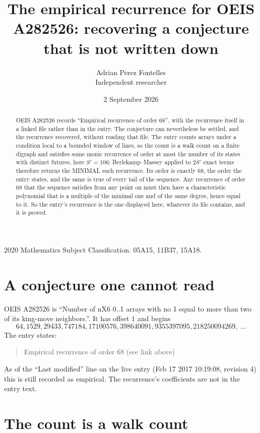 \documentclass[11pt,a4paper]{article}
\title{The empirical recurrence for OEIS A282526: recovering a conjecture that is not written down}
\author{Adrian Perez Fontelles\\ \small Independent researcher}
\date{2 September 2026}
\theoremstyle{plain}
\theoremstyle{definition}
\begin{document}
\maketitle

\begin{abstract}
OEIS A282526 records ``Empirical recurrence of order $68$'', with the recurrence itself in a
linked file rather than in the entry. The conjecture can nevertheless be settled, and the
recurrence recovered, without reading that file. The entry counts arrays under a condition
local to a bounded window of lines, so the count is a walk count on a finite digraph and
satisfies some monic recurrence of order at most the number of its states with distinct
futures, here $S'=106$; Berlekamp--Massey applied to $2S'$ exact
terms therefore returns the MINIMAL such recurrence. Its order is exactly $68$, the order
the entry states, and the same is true of every tail of the sequence. Any recurrence of order
$68$ that the sequence satisfies from any point on must then have a characteristic
polynomial that is a multiple of the minimal one and of the same degree, hence equal to it. So
the entry's recurrence is the one displayed here, whatever its file contains, and it is
proved.
\end{abstract}

\noindent\small 2020 Mathematics Subject Classification. 05A15, 11B37, 15A18.\normalsize

\section{A conjecture one cannot read}

OEIS A282526 is ``Number of nX6 0..1 arrays with no 1 equal to more than two of its king-move neighbors.''. It has offset $1$ and begins
\[
64, 1529, 29433, 747184, 17100576, 398640091, 9355397095, 218250094269,\ \dots
\]
The entry states:
\begin{quote}
Empirical recurrence of order 68 (see link above)
\end{quote}
As of the ``Last modified'' line on the live entry (Feb 17 2017 10:19:08, revision 4) this is still
recorded as empirical. The recurrence's coefficients are not in the entry text.

\section{The count is a walk count}
\end{document}
